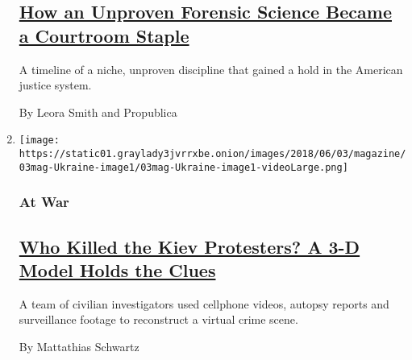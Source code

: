 \begin{enumerate}
  \hypertarget{how-an-unproven-forensic-science-became-a-courtroom-staple}{%
  \subsection{\texorpdfstring{\href{/interactive/2018/05/31/magazine/bloodstain-pattern-analysis-timeline.html}{How
  an Unproven Forensic Science Became a Courtroom
  Staple}}{How an Unproven Forensic Science Became a Courtroom Staple}}\label{how-an-unproven-forensic-science-became-a-courtroom-staple}}

  A timeline of a niche, unproven discipline that gained a hold in the
  American justice system.

  By Leora Smith and Propublica
\item
  \texttt{[image: https://static01.graylady3jvrrxbe.onion/images/2018/06/03/magazine/03mag-Ukraine-image1/03mag-Ukraine-image1-videoLarge.png]}

  \hypertarget{at-war}{%
  \subsubsection{At War}\label{at-war}}

  \hypertarget{who-killed-the-kiev-protesters-a-3-d-model-holds-the-clues}{%
  \subsection{\texorpdfstring{\href{/2018/05/30/magazine/ukraine-protest-video.html}{Who
  Killed the Kiev Protesters? A 3-D Model Holds the
  Clues}}{Who Killed the Kiev Protesters? A 3-D Model Holds the Clues}}\label{who-killed-the-kiev-protesters-a-3-d-model-holds-the-clues}}

  A team of civilian investigators used cellphone videos, autopsy
  reports and surveillance footage to reconstruct a virtual crime scene.

  By Mattathias Schwartz
\end{enumerate}

